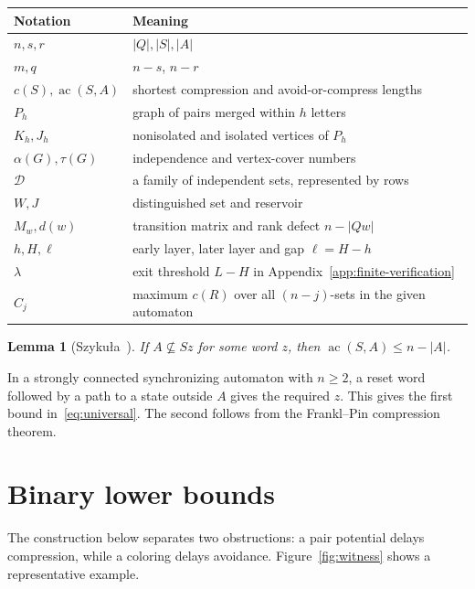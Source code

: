 \documentclass[11pt]{article}
\newtheorem{lemma}[theorem]{Lemma}
\theoremstyle{definition}
\theoremstyle{plain}
\newcommand{\ac}{\operatorname{ac}}
\begin{document}
\begin{center}\small
\begin{tabular}{@{}ll@{}}\toprule
Notation & Meaning\\\midrule
$n,s,r$ & $|Q|,|S|,|A|$\\
$m,q$ & $n-s$, $n-r$\\
$c(S),\ac(S,A)$ & shortest compression and avoid-or-compress lengths\\
$P_h$ & graph of pairs merged within $h$ letters\\
$K_h,J_h$ & nonisolated and isolated vertices of $P_h$\\
$\alpha(G),\tau(G)$ & independence and vertex-cover numbers\\
$\mathcal D$ & a family of independent sets, represented by rows\\
$W,J$ & distinguished set and reservoir\\
$M_w,d(w)$ & transition matrix and rank defect $n-|Qw|$\\
$h,H,\ell$ & early layer, later layer and gap $\ell=H-h$\\
$\lambda$ & exit threshold $L-H$ in Appendix~\ref{app:finite-verification}\\
$C_j$ & maximum $c(R)$ over all $(n-j)$-sets in the given automaton\\
\bottomrule\end{tabular}
\end{center}
\begin{lemma}[Szyku\l a~\cite{szykula2018,szykula2026}]\label{lem:upper}
If $A\nsubseteq Sz$ for some word $z$, then $\ac(S,A)\le n-|A|$.
\end{lemma}

In a strongly connected synchronizing automaton with $n\ge2$, a reset word followed by a path to a state outside $A$ gives the required $z$. This gives the first bound in~\eqref{eq:universal}.
The second follows from the Frankl--Pin compression theorem.
\section{Binary lower bounds}\label{sec:diagram}
The construction below separates two obstructions: a pair potential
delays compression, while a coloring delays avoidance. Figure~\ref{fig:witness}
shows a representative example.
\end{document}
